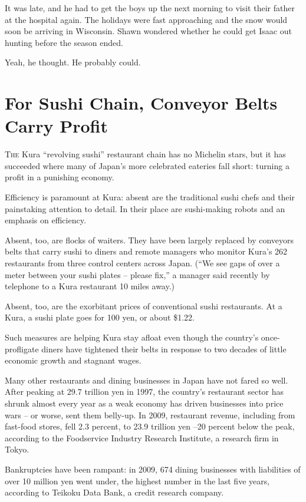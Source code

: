 ﻿\documentclass[12pt]{article}
\begin{document}
It was late, and he had to get the boys up the next morning to visit their father at the hospital
again. The holidays were fast approaching and the snow would soon be arriving in Wisconsin. Shawn
wondered whether he could get Isaac out hunting before the season ended.

Yeah, he thought. He probably could.

\section{For Sushi Chain, Conveyor Belts Carry Profit}

\lettrine{T}{he} Kura ``revolving sushi'' restaurant chain has no Michelin
stars, but it has succeeded where many of Japan's more celebrated eateries fall short: turning a
profit in a punishing economy.

Efficiency is paramount at Kura: absent are the traditional sushi chefs and their painstaking
attention to detail. In their place are sushi-making robots and an emphasis on efficiency.

Absent, too, are flocks of waiters. They have been largely replaced by conveyors belts that carry
sushi to diners and remote managers who monitor Kura's 262 restaurants from three control centers
across Japan. (``We see gaps of over a meter between your sushi plates -- please fix,'' a manager
said recently by telephone to a Kura restaurant 10 miles away.)

Absent, too, are the exorbitant prices of conventional sushi restaurants. At a Kura, a sushi plate
goes for 100 yen, or about \$1.22.

Such measures are helping Kura stay afloat even though the country's once-profligate diners have
tightened their belts in response to two decades of little economic growth and stagnant wages.

Many other restaurants and dining businesses in Japan have not fared so well. After peaking at 29.7
trillion yen in 1997, the country's restaurant sector has shrunk almost every year as a weak economy
has driven businesses into price wars -- or worse, sent them belly-up. In 2009, restaurant revenue,
including from fast-food stores, fell 2.3 percent, to 23.9 trillion yen --20 percent below the peak,
according to the Foodservice Industry Research Institute, a research firm in Tokyo.

Bankruptcies have been rampant: in 2009, 674 dining businesses with liabilities of over 10 million
yen went under, the highest number in the last five years, according to Teikoku Data Bank, a credit
research company.
\end{document}
